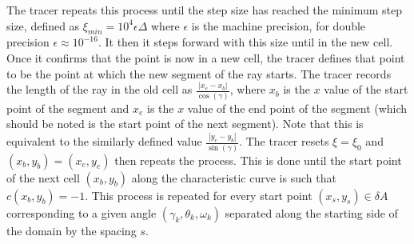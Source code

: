 \documentclass{article}
\begin{document}
The tracer repeats this process until the step size has reached the minimum step size, defined as $\xi_{min}=10^4 \epsilon \Delta$ where $\epsilon$ is the machine precision, for double precision $\epsilon\approx10^{-16}$. 
It then it steps forward with this size until in the new cell.
Once it confirms that the point is now in a new cell, the tracer defines that point to be the point at which the new segment of the ray starts.
The tracer records the length of the ray in the old cell as $\frac{|x_e-x_b|}{\cos{(\gamma)}}$, where $x_b$ is the $x$ value of the start point of the segment and $x_e$ is the $x$ value of the end point of the segment (which should be noted is the start point of the next segment). 
Note that this is equivalent to the similarly defined value $\frac{|y_e-y_b|}{\sin{(\gamma)}}$. 
The tracer resets $\xi=\xi_0$ and $(x_b,y_b)=(x_e,y_e)$ then repeats the process. 
This is done until the start point of the next cell $(x_b,y_b)$ along the characteristic curve is such that $c(x_b,y_b)=-1$.
This process is repeated for every start point $(x_s,y_s)\in \delta A$ corresponding to a given angle  $(\gamma_k,\theta_k,\omega_k)$ separated along the starting side of the domain by the spacing $s$. 
\end{document}
